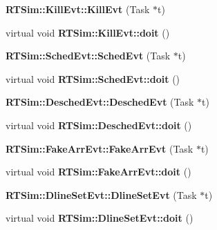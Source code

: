 \begin{DoxyCompactItemize}
\item 
{\bfseries R\+T\+Sim\+::\+Kill\+Evt\+::\+Kill\+Evt} (Task $\ast$t)\hypertarget{group__tasks_gaf68c08f1c14438e20e8d53f5d406c658}{}\label{group__tasks_gaf68c08f1c14438e20e8d53f5d406c658}

\item 
virtual void {\bfseries R\+T\+Sim\+::\+Kill\+Evt\+::doit} ()\hypertarget{group__tasks_gad6a9721a0c0cf80b5587767bf3e1d3e4}{}\label{group__tasks_gad6a9721a0c0cf80b5587767bf3e1d3e4}

\item 
{\bfseries R\+T\+Sim\+::\+Sched\+Evt\+::\+Sched\+Evt} (Task $\ast$t)\hypertarget{group__tasks_ga86e6bd41bcb26e15bf8bd170b5769ddc}{}\label{group__tasks_ga86e6bd41bcb26e15bf8bd170b5769ddc}

\item 
virtual void {\bfseries R\+T\+Sim\+::\+Sched\+Evt\+::doit} ()\hypertarget{group__tasks_ga4247cb8f2489bca7dae349679a5ac99c}{}\label{group__tasks_ga4247cb8f2489bca7dae349679a5ac99c}

\item 
{\bfseries R\+T\+Sim\+::\+Desched\+Evt\+::\+Desched\+Evt} (Task $\ast$t)\hypertarget{group__tasks_ga5d20f278f2695960f704dd464196cde4}{}\label{group__tasks_ga5d20f278f2695960f704dd464196cde4}

\item 
virtual void {\bfseries R\+T\+Sim\+::\+Desched\+Evt\+::doit} ()\hypertarget{group__tasks_gade782d2e2787b22ae072b69407179309}{}\label{group__tasks_gade782d2e2787b22ae072b69407179309}

\item 
{\bfseries R\+T\+Sim\+::\+Fake\+Arr\+Evt\+::\+Fake\+Arr\+Evt} (Task $\ast$t)\hypertarget{group__tasks_gad5b2c5faa974949132f5109912465a10}{}\label{group__tasks_gad5b2c5faa974949132f5109912465a10}

\item 
virtual void {\bfseries R\+T\+Sim\+::\+Fake\+Arr\+Evt\+::doit} ()\hypertarget{group__tasks_ga6b10161b80083bad9a3d2c7c4f5fe186}{}\label{group__tasks_ga6b10161b80083bad9a3d2c7c4f5fe186}

\item 
{\bfseries R\+T\+Sim\+::\+Dline\+Set\+Evt\+::\+Dline\+Set\+Evt} (Task $\ast$t)\hypertarget{group__tasks_ga9444320ac3692f7ddd7afd7aa1886f2a}{}\label{group__tasks_ga9444320ac3692f7ddd7afd7aa1886f2a}

\item 
virtual void {\bfseries R\+T\+Sim\+::\+Dline\+Set\+Evt\+::doit} ()\hypertarget{group__tasks_ga0db671e9857784d5d58be21bdb566fad}{}\label{group__tasks_ga0db671e9857784d5d58be21bdb566fad}


\end{DoxyCompactItemize}

